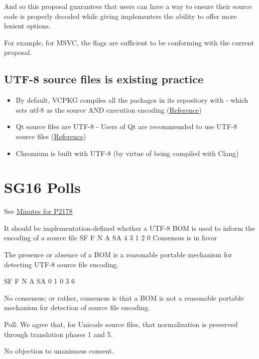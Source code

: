 \documentclass{wg21}
\begin{document}
And so this proposal guarantees that users can have a way to ensure their source code is properly decoded while giving implementers
the ability to offer more lenient options.

For example, for MSVC, the flags  are sufficient to be conforming with the current proposal.


\subsection{UTF-8 source files is existing practice}

\begin{itemize}
    \item By default, VCPKG compiles all the packages in its repository with  - which sets utf-8 as the source AND execution encoding (\href{https://github.com/vicroms/vcpkg/blob/master/scripts/toolchains/windows.cmake#L16}{Reference})
    \item Qt source files are UTF-8 - Users of Qt are recommemded to use UTF-8 source files (\href{https://wiki.qt.io/Strings_and_encodings_in_Qt}{Reference})
    \item Chromium is built with UTF-8 (by virtue of being compiled with Clang)
\end{itemize}

\section{SG16 Polls}

See \href{https://github.com/sg16-unicode/sg16-meetings/blob/master/README-2020.md}{Minutes for P2178}

\begin{codeblock}


It should be implementation-defined whether a UTF-8 BOM is used to inform the encoding of a source file
SF	F	N	A	SA
4	3	1	2	0
Consensus is in favor

The presence or absence of a BOM is a reasonable portable mechanism
for detecting UTF-8 source file encoding.

SF	F	N	A	SA
0	1	0	3	6

No consensus;  or rather,
consensus is that a BOM is not a reasonable portable mechanism for detection of source file encoding.


Poll: We agree that, for Unicode source files, that normalization is preserved
through translation phases 1 and 5.

No objection to unanimous consent.

\end{codeblock}
\end{document}
